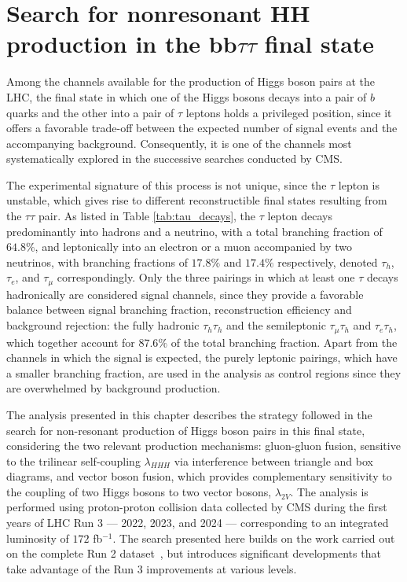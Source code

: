 \chapter{Search for nonresonant HH production in the bb\texorpdfstring{$\tau\tau$}{ττ} final state}
\label{ch:bbtt_analysis}
Among the channels available for the production of Higgs boson pairs at the LHC, the final state in which one of the Higgs bosons decays into a pair of $b$ quarks and the other into a pair of $\tau$ leptons holds a privileged position, since it offers a favorable trade-off between the expected number of signal events and the accompanying background. Consequently, it is one of the channels most systematically explored in the successive searches conducted by CMS. 

The experimental signature of this process is not unique, since the $\tau$ lepton is unstable, which gives rise to different reconstructible final states resulting from the $\tau\tau$ pair. As listed in Table \ref{tab:tau_decays}, the $\tau$ lepton decays predominantly into hadrons and a neutrino, with a total branching fraction of $64.8\%$, and leptonically into an electron or a muon accompanied by two neutrinos, with branching fractions of $17.8\%$ and $17.4\%$ respectively, denoted $\tau_h$, $\tau_e$, and $\tau_\mu$ correspondingly. Only the three pairings in which at least one $\tau$ decays hadronically are considered signal channels, since they provide a favorable balance between signal branching fraction, reconstruction efficiency and background rejection: the fully hadronic $\tau_h\tau_h$ and the semileptonic $\tau_\mu\tau_h$ and $\tau_e\tau_h$, which together account for $87.6\%$ of the total branching fraction. Apart from the channels in which the signal is expected, the purely leptonic pairings, which have a smaller branching fraction, are used in the analysis as control regions since they are overwhelmed by background production.

The analysis presented in this chapter describes the strategy followed in the search for non-resonant production of Higgs boson pairs in this final state, considering the two relevant production mechanisms: gluon-gluon fusion, sensitive to the trilinear self-coupling $\lambda_{HHH}$ via interference between triangle and box diagrams, and vector boson fusion, which provides complementary sensitivity to the coupling of two Higgs bosons to two vector bosons, $\lambda_{2V}$. The analysis is performed using proton-proton collision data collected by CMS during the first years of LHC Run 3 — 2022, 2023, and 2024 — corresponding to an integrated luminosity of $172$ fb$^{-1}$. The search presented here builds on the work carried out on the complete Run 2 dataset~\cite{CMS-HIG-20-010}, but introduces significant developments that take advantage of the Run 3 improvements at various levels. 

